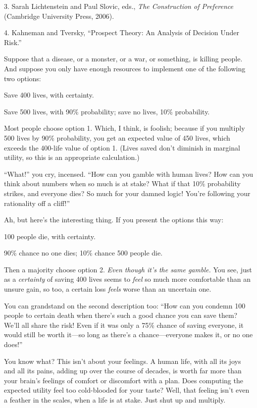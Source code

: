 {
 3. Sarah Lichtenstein and Paul Slovic, eds., \textit{The
Construction of Preference} (Cambridge University Press, 2006).}

{
 4. Kahneman and Tversky, ``Prospect Theory: An
Analysis of Decision Under Risk.''}


{
 Suppose that a disease, or a monster, or a war, or something, is
killing people. And suppose you only have enough resources to implement
one of the following two options:}

{
 Save 400 lives, with certainty.}

{
 Save 500 lives, with 90\% probability; save no lives, 10\%
probability.}

{
 Most people choose option 1. Which, I think, is foolish; because
if you multiply 500 lives by 90\% probability, you get an expected
value of 450 lives, which exceeds the 400-life value of option 1.
(Lives saved don't diminish in marginal utility, so
this is an appropriate calculation.)}

{
 ``What!'' you cry, incensed.
``How can you gamble with human lives? How can you
think about numbers when so much is at stake? What if that 10\%
probability strikes, and everyone dies? So much for your damned logic!
You're following your rationality off a
cliff!''}

{
 Ah, but here's the interesting thing. If you
present the options this way:}

{
 100 people die, with certainty.}

{
 90\% chance no one dies; 10\% chance 500 people die.}

{
 Then a majority choose option 2. \textit{Even though
it's the same gamble.} You see, just as a
\textit{certainty} of saving 400 lives seems to \textit{feel} so much
more comfortable than an unsure gain, so too, a certain loss
\textit{feels} worse than an uncertain one.}

{
 You can grandstand on the second description too:
``How can you condemn 100 people to certain death when
there's such a good chance you can save them?
We'll all share the risk! Even if it was only a 75\%
chance of saving everyone, it would still be worth it---so long as
there's a chance---everyone makes it, or no one
does!''}

{
 You know what? This isn't about your feelings. A
human life, with all its joys and all its pains, adding up over the
course of decades, is worth far more than your brain's
feelings of comfort or discomfort with a plan. Does computing the
expected utility feel too cold-blooded for your taste? Well, that
feeling isn't even a feather in the scales, when a life
is at stake. Just shut up and multiply.}

